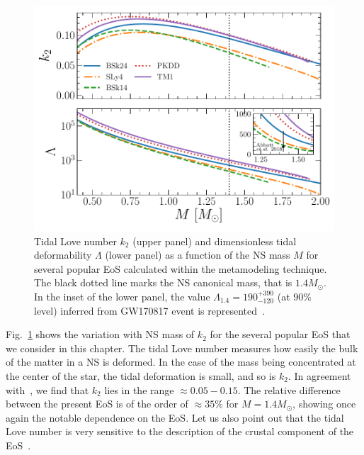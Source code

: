 \begin{figure}[!t]
  \begin{center}
    \includegraphics[width=0.9\linewidth]{figures/tidal_popular.pdf}
  \end{center}
  \caption[Tidal Love number and dimensionless tidal deformability versus 
  neutron star mass for several popular equations of state]{Tidal Love number 
    $k_2$ (upper panel) and 
    dimensionless tidal deformability $\Lambda$ (lower panel) as a function of 
    the NS mass $M$ for several popular EoS calculated within the metamodeling 
  technique. The black dotted line marks the NS canonical mass, that is
$1.4M_\odot$. In the inset of the lower panel, the value 
$\Lambda_{1.4} = 190_{-120}^{+390}$ (at $90\%$ level) inferred from GW170817 
event is represented~\cite{GW1}.}\label{fig:tidal_popular}
\end{figure}

Fig.~\ref{fig:tidal_popular} shows the variation with NS mass of $k_2$ for the 
several popular EoS that we consider in this chapter. The tidal Love number
measures how easily the bulk of the matter in a NS is deformed. In the case
of the mass being concentrated at the center of the star, the tidal deformation 
is small, and so is $k_2$. In agreement with~\cite{Hinderer2010}, we find that 
$k_2$ lies in the range $\approx 0.05-0.15$. The relative difference between
the present EoS is of the order of $\approx 35\%$ for $M=1.4M_\odot$, showing
once again the notable dependence on the EoS.  
Let us also point out that the tidal Love number is very sensitive to the 
description of the crustal component of the EoS~\cite{Piekarewicz2019}. 

